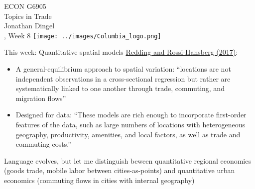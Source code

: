 \documentclass[11pt,notes=hide,aspectratio=169]{beamer}
\begin{document}
\begin{frame}[plain]
\begin{center}
\large
\textcolor{columbiadarkblue}{ECON G6905\\
Topics in Trade\\ 
Jonathan Dingel\\
\semester, Week 8}
\vfill 
\texttt{[image: ../images/Columbia\_logo.png]}
\end{center}
\end{frame}
\begin{frame}{This week: Quantitative spatial models}
\href{https://doi.org/10.1146/annurev-economics-063016-103713}{Redding and Rossi-Hansberg (2017)}:
\begin{itemize}
\item A general-equilibrium approach to spatial variation:
``locations are not independent observations in a cross-sectional regression but rather are systematically linked to one another through trade, commuting, and migration flows''
\item Designed for data: 
``These models are rich enough to incorporate first-order features of the data, such as large numbers of locations with heterogeneous geography, productivity, amenities, and local factors, as well as trade and commuting costs.''
\end{itemize}
Language evolves, but let me distinguish beween
quantitative regional economics (goods trade, mobile labor between cities-as-points)
and
quantitative urban economics (commuting flows in cities with internal geography)
\end{frame}
\end{document}
